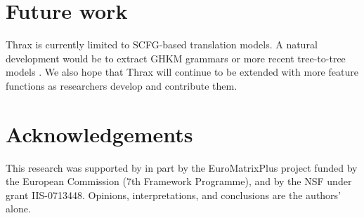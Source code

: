 \documentclass[11pt]{article}
\begin{document}
\section{Future work}

Thrax is currently limited to SCFG-based translation models.  A natural
development would be to extract GHKM grammars \cite{galley2004whats}
or more recent tree-to-tree models
\cite{zhang2008,liu2009,chiang2010}.  We also hope that Thrax will
continue to be extended with more feature functions as researchers
develop and contribute them.

\section*{Acknowledgements}
This research was supported by in part by the EuroMatrixPlus project funded by the European Commission (7th Framework Programme), and by the NSF under grant IIS-0713448. Opinions, interpretations, and conclusions are the authors' alone.



\end{document}
